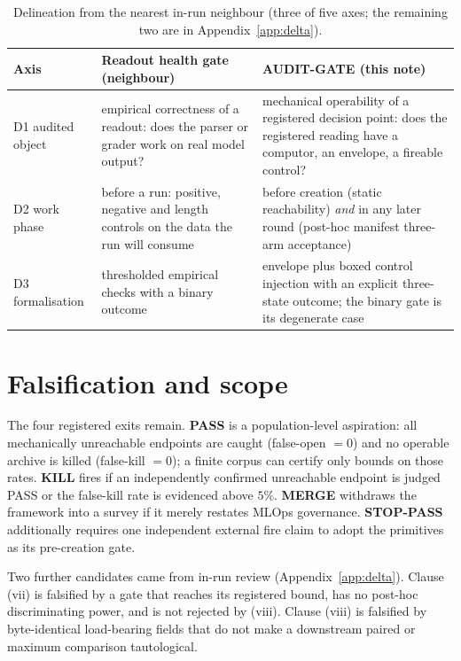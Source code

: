 \documentclass{article}
\begin{document}
\begin{table}[t]
\caption{Delineation from the nearest in-run neighbour (three of five axes; the remaining
two are in Appendix~\ref{app:delta}).}
\label{tab:delta}
\centering
\scriptsize
\setlength{\tabcolsep}{4pt}
\begin{tabular}{@{}L{58pt} L{158pt} L{158pt}@{}}
\toprule
Axis & Readout health gate (neighbour) & AUDIT-GATE (this note) \\
\midrule
D1 audited object & empirical correctness of a readout: does the parser or grader work on
real model output? & mechanical operability of a registered decision point: does the
registered reading have a computor, an envelope, a fireable control? \\
\addlinespace[2pt]
D2 work phase & before a run: positive, negative and length controls on the data the run
will consume & before creation (static reachability) \emph{and} in any later round
(post-hoc manifest three-arm acceptance) \\
\addlinespace[2pt]
D3 formalisation & thresholded empirical checks with a binary outcome & envelope plus
boxed control injection with an explicit three-state outcome; the binary gate is its
degenerate case \\
\bottomrule
\end{tabular}
\end{table}

\section{Falsification and scope}
\label{sec:falsification}

The four registered exits remain. \textbf{PASS} is a population-level aspiration: all
mechanically unreachable endpoints are caught (false-open ${}={}0$) and no operable archive
is killed (false-kill ${}={}0$); a finite corpus can certify only bounds on those rates.
\textbf{KILL} fires if an independently confirmed unreachable endpoint is judged PASS or
the false-kill rate is evidenced above $5\%$. \textbf{MERGE} withdraws the framework into a
survey if it merely restates MLOps governance. \textbf{STOP-PASS} additionally requires one
independent external fire claim to adopt the primitives as its pre-creation gate.

Two further candidates came from in-run review (Appendix~\ref{app:delta}). Clause (vii) is
falsified by a gate that reaches its registered bound, has no post-hoc discriminating power,
and is not rejected by (viii). Clause (viii) is falsified by byte-identical load-bearing
fields that do not make a downstream paired or maximum comparison tautological.
\end{document}
